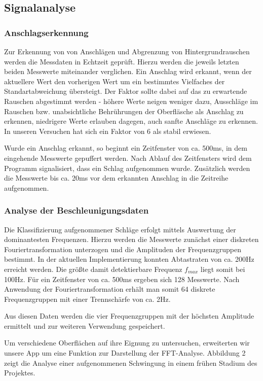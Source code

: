 \subsection*{Signalanalyse}
\label{sec:Signalanalyse}
\subsubsection*{Anschlagserkennung}
Zur Erkennung von von Anschlägen und Abgrenzung von Hintergrundrauschen werden die Messdaten in Echtzeit geprüft. Hierzu werden die jeweils letzten beiden Messwerte miteinander verglichen. Ein Anschlag wird erkannt, wenn der aktuellere Wert den vorherigen Wert um ein bestimmtes Vielfaches der Standartabweichung übersteigt. Der Faktor sollte dabei auf das zu erwartende Rauschen abgestimmt werden - höhere Werte neigen weniger dazu, Ausschläge im Rauschen bzw. unabsichtliche Behrührungen der Oberfläsche als Anschlag zu erkennen, niedrigere Werte erlauben dagegen, auch sanfte Anschläge zu erkennen. In unseren Versuchen hat sich ein Faktor von 6 als stabil erwiesen.

Wurde ein Anschlag erkannt, so beginnt ein Zeitfenster von ca. 500ms, in dem eingehende Messwerte gepuffert werden. Nach Ablauf des Zeitfensters wird dem Programm signalisiert, dass ein Schlag aufgenommen wurde. Zusätzlich werden die Messwerte bis ca. 20ms vor dem erkannten Anschlag in die Zeitreihe aufgenommen.

\subsubsection*{Analyse der Beschleunigungsdaten}
Die Klassifizierung aufgenommener Schläge erfolgt mittels Auswertung der dominantesten Frequenzen.
Hierzu werden die Messwerte zunächst einer diskreten Fouriertransformation unterzogen und die Amplituden der Frequenzgruppen bestimmt.
In der aktuellen Implementierung konnten Abtastraten von ca. 200Hz erreicht werden. Die größte damit detektierbare Frequenz $f_{max}$ liegt somit bei 100Hz.
Für ein Zeitfenster von ca. 500ms ergeben sich 128 Messwerte.
Nach Anwendung der Fouriertransformation erhält man somit 64 diskrete Frequenzgruppen mit einer Trennschärfe von ca. 2Hz.

Aus diesen Daten werden die vier Frequenzgruppen mit der höchsten Amplitude ermittelt und zur weiteren Verwendung gespeichert.

Um verschiedene Oberflächen auf ihre Eignung zu untersuchen, erweiterten wir unsere App um eine Funktion zur Darstellung der FFT-Analyse. Abbildung 2 zeigt die Analyse einer aufgenommenen Schwingung in einem frühen Stadium des Projektes.


